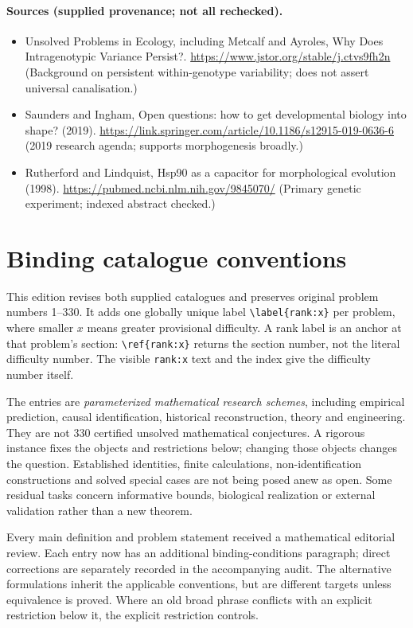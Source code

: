 \documentclass[11pt]{article}
\begin{document}
\paragraph{Sources (supplied provenance; not all rechecked).} \begin{itemize}
\item Unsolved Problems in Ecology, including Metcalf and Ayroles, Why Does Intragenotypic Variance Persist?. \url{https://www.jstor.org/stable/j.ctvs9fh2n} (Background on persistent within-genotype variability; does not assert universal canalisation.)
\item Saunders and Ingham, Open questions: how to get developmental biology into shape? (2019). \url{https://link.springer.com/article/10.1186/s12915-019-0636-6} (2019 research agenda; supports morphogenesis broadly.)
\item Rutherford and Lindquist, Hsp90 as a capacitor for morphological evolution (1998). \url{https://pubmed.ncbi.nlm.nih.gov/9845070/} (Primary genetic experiment; indexed abstract checked.)
\end{itemize}


\section*{Binding catalogue conventions}
This edition revises both supplied catalogues and preserves original problem numbers 1--330. It adds one globally unique label \verb|\label{rank:x}| per problem, where smaller $x$ means greater provisional difficulty. A rank label is an anchor at that problem's section: \verb|\ref{rank:x}| returns the section number, not the literal difficulty number. The visible \texttt{rank:x} text and the index give the difficulty number itself.

The entries are \emph{parameterized mathematical research schemes}, including empirical prediction, causal identification, historical reconstruction, theory and engineering. They are not 330 certified unsolved mathematical conjectures. A rigorous instance fixes the objects and restrictions below; changing those objects changes the question. Established identities, finite calculations, non-identification constructions and solved special cases are not being posed anew as open. Some residual tasks concern informative bounds, biological realization or external validation rather than a new theorem.

Every main definition and problem statement received a mathematical editorial review. Each entry now has an additional binding-conditions paragraph; direct corrections are separately recorded in the accompanying audit. The alternative formulations inherit the applicable conventions, but are different targets unless equivalence is proved. Where an old broad phrase conflicts with an explicit restriction below it, the explicit restriction controls.
\end{document}

